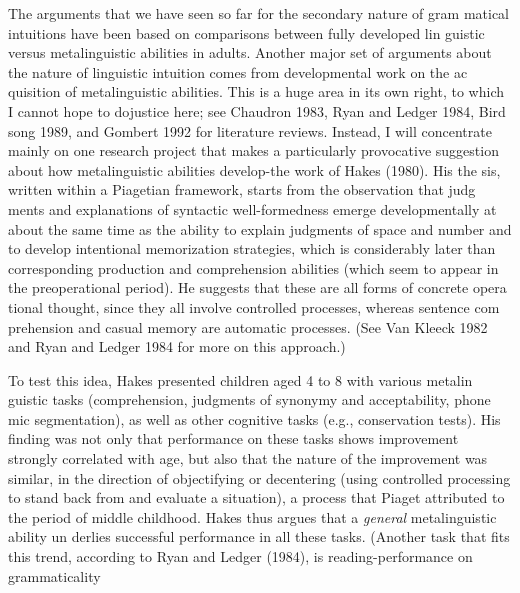 \begin{styleTextbody}
The arguments that we have seen so far for the secondary nature of gram\- matical intuitions have been based on comparisons between fully developed lin\- guistic versus metalinguistic abilities in adults. Another major set of arguments about the nature of linguistic intuition comes from developmental work on the ac\- quisition of metalinguistic abilities. This is a huge area in its own right, to which I cannot hope to dojustice here; see Chaudron 1983, Ryan and Ledger 1984, Bird\- song 1989, and Gombert 1992 for literature reviews. Instead, I will concentrate mainly on one research project that makes a particularly provocative suggestion about how metalinguistic abilities develop-the work of Hakes (1980). His the\- sis, written within a Piagetian framework, starts from the observation that judg\- ments and explanations of syntactic well-formedness emerge developmentally at about the same time as the ability to explain judgments of space and number and to develop intentional memorization strategies, which is considerably later than corresponding production and comprehension abilities (which seem to appear in the preoperational period). He suggests that these are all forms of concrete opera\- tional thought, since they all involve controlled processes, whereas sentence com\- prehension and casual memory are automatic processes. (See Van Kleeck 1982 and Ryan and Ledger 1984 for more on this approach.)
\end{styleTextbody}


\begin{styleTextbody}
To test this idea, Hakes presented children aged 4 to 8 with various metalin\- guistic tasks (comprehension, judgments of synonymy and acceptability, phone\- mic segmentation), as well as other cognitive tasks (e.g., conservation tests). His finding was not only that performance on these tasks shows improvement strongly correlated with age, but also that the nature of the improvement was similar, in the direction of objectifying or {\textquotedbl}decentering{\textquotedbl} (using controlled processing to stand back from and evaluate a situation), a process that Piaget attributed to the period of middle childhood. Hakes thus argues that a \textit{general}\textit{ }metalinguistic ability un\- derlies successful performance in all these tasks. (Another task that fits this trend, according to Ryan and Ledger (1984), is reading-performance on grammaticality
\end{styleTextbody}


